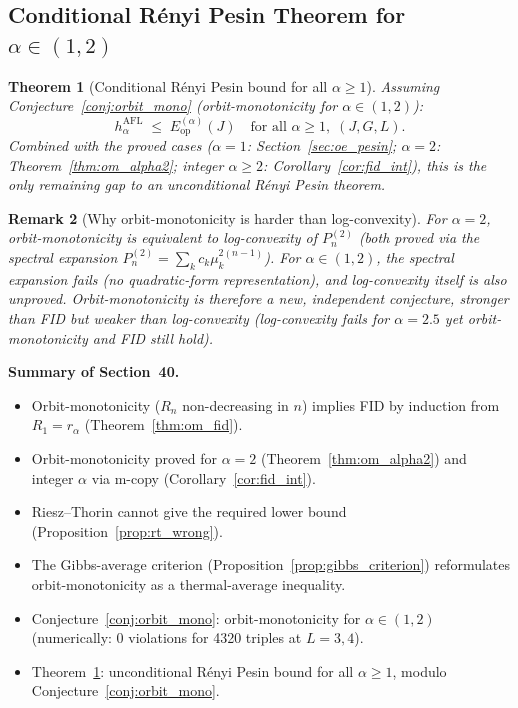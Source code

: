 \documentclass[12pt,a4paper]{article}
\newtheorem{theorem}{Theorem}[section]
\newtheorem{remark}[theorem]{Remark}
\begin{document}
\subsection{Conditional Rényi Pesin Theorem for $\alpha\in(1,2)$}
\label{sec:cond_pesin}

\begin{theorem}[Conditional Rényi Pesin bound for all $\alpha\geq 1$]
\label{thm:cond_renyi_pesin}
Assuming Conjecture~\ref{conj:orbit_mono} (orbit-monotonicity for $\alpha\in(1,2)$):
\[
  h_\alpha^{\mathrm{AFL}} \;\leq\; E_{\mathrm{op}}^{(\alpha)}(J)
  \quad\text{for all }\alpha\geq 1,\;(J,G,L).
\]
Combined with the proved cases ($\alpha=1$: Section~\ref{sec:oe_pesin};
$\alpha=2$: Theorem~\ref{thm:om_alpha2}; integer $\alpha\geq 2$: Corollary~\ref{cor:fid_int}),
this is the only remaining gap to an unconditional Rényi Pesin theorem.
\end{theorem}

\begin{remark}[Why orbit-monotonicity is harder than log-convexity]
For $\alpha=2$, orbit-monotonicity is equivalent to log-convexity of $P_n^{(2)}$
(both proved via the spectral expansion $P_n^{(2)}=\sum_k c_k\mu_k^{2(n-1)}$).
For $\alpha\in(1,2)$, the spectral expansion fails (no quadratic-form representation),
and log-convexity itself is also unproved.  Orbit-monotonicity is therefore
a new, independent conjecture, stronger than FID but weaker than log-convexity
(log-convexity fails for $\alpha=2.5$ yet orbit-monotonicity and FID still hold).
\end{remark}

\bigskip
\noindent\textbf{Summary of Section~40.}
\begin{itemize}
\item Orbit-monotonicity ($R_n$ non-decreasing in $n$) implies FID by induction from
  $R_1=r_\alpha$ (Theorem~\ref{thm:om_fid}).
\item Orbit-monotonicity proved for $\alpha=2$ (Theorem~\ref{thm:om_alpha2}) and
  integer $\alpha$ via m-copy (Corollary~\ref{cor:fid_int}).
\item Riesz--Thorin cannot give the required lower bound
  (Proposition~\ref{prop:rt_wrong}).
\item The Gibbs-average criterion (Proposition~\ref{prop:gibbs_criterion}) reformulates
  orbit-monotonicity as a thermal-average inequality.
\item Conjecture~\ref{conj:orbit_mono}: orbit-monotonicity for $\alpha\in(1,2)$
  (numerically: 0 violations for 4320 triples at $L=3,4$).
\item Theorem~\ref{thm:cond_renyi_pesin}: unconditional Rényi Pesin bound for all
  $\alpha\geq 1$, modulo Conjecture~\ref{conj:orbit_mono}.
\end{itemize}
\end{document}
